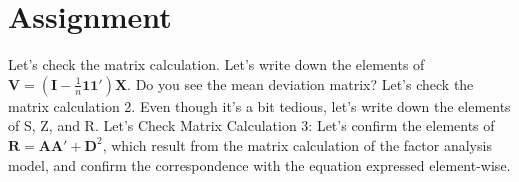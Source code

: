 \documentclass{ltjsbook}
\begin{document}
\section{Assignment}
Let's check the matrix calculation. Let's write down the elements of $\bm{V} = ( \bm{I} -\frac{1}{n}\bm{1} \bm{1} ')\bm{X}$. Do you see the mean deviation matrix?
Let's check the matrix calculation 2. Even though it's a bit tedious, let's write down the elements of S, Z, and R.
Let's Check Matrix Calculation 3: Let's confirm the elements of $\bm{R} = \bm{A} \bm{A} ' + \bm{D}^2$, which result from the matrix calculation of the factor analysis model, and confirm the correspondence with the equation expressed element-wise.
\end{document}
